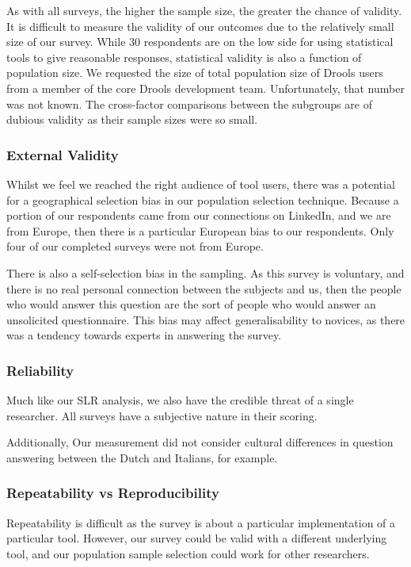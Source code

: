 As with all surveys, the higher the sample size, the greater the chance of validity.
It is difficult to measure the validity of our outcomes due to the relatively small size of our survey.
While 30 respondents are on the low side for using statistical tools to give reasonable responses, statistical validity is also a function of population size.
We requested the size of total population size of Drools users from a member of the core Drools development team.  
Unfortunately, that number was not known.
The cross-factor comparisons between the subgroups are of dubious validity as their sample sizes were so small.

\subsubsection{External Validity}
Whilst we feel we reached the right audience of tool users, there was a potential for a geographical selection bias in our population selection technique.
Because a portion of our respondents came from our connections on LinkedIn, and we are from Europe, then there is a particular European bias to our respondents.
Only four of our completed surveys were not from Europe.

There is also a self-selection bias in the sampling. 
As this survey is voluntary, and there is no real personal connection between the subjects and us, then the people who would answer this question are the sort of people who would answer an unsolicited questionnaire.
This bias may affect generalisability to novices, as there was a tendency towards experts in answering the survey.

\subsubsection{Reliability}
Much like our SLR analysis, we also have the credible threat of a single researcher.
All surveys have a subjective nature in their scoring.

Additionally, Our measurement did not consider cultural differences in question answering between the Dutch and Italians, for example.

\subsubsection{Repeatability vs Reproducibility}
Repeatability is difficult as the survey is about a particular implementation of a particular tool.
However, our survey could be valid with a different underlying tool, and our population sample selection could work for other researchers.

